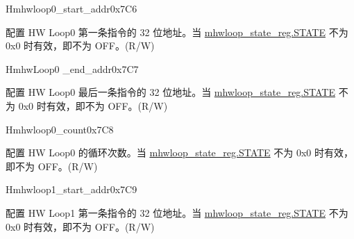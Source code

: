 \begin{register}{H}{mhwloop0\_start\_addr}{0x7C6}\label{regdesc:MHWLOOP0_START_ADDR}
%
\regnewline%
\begin{regdesc}\begin{reglist}
\label{fielddesc:HWLP0_SA}\item [SA] 配置 HW Loop0 第一条指令的 32 位地址。当 \hyperref[fielddesc:HWSTATE]{mhwloop\_state\_reg.STATE} 不为 0x0 时有效，即不为 OFF。(R/W)
\end{reglist}\end{regdesc}
\end{register}

\begin{register}{H}{mhwLoop0 \_end\_addr}{0x7C7}\label{regdesc:MHWLOOP0_END_ADDR}
%
\regnewline%
\begin{regdesc}\begin{reglist}
\label{fielddesc:HWLP0_EA}\item [EA] 配置 HW Loop0 最后一条指令的 32 位地址。当 \hyperref[fielddesc:HWSTATE]{mhwloop\_state\_reg.STATE} 不为 0x0 时有效，即不为 OFF。(R/W)
\end{reglist}\end{regdesc}
\end{register}

\begin{register}{H}{mhwloop0\_count}{0x7C8}\label{regdesc:MHWLOOP0_COUNT}
%
%
\regnewline%
\begin{regdesc}\begin{reglist}
\label{fielddesc:HWLP0_CNT}\item [COUNT] 配置 HW Loop0 的循环次数。当 \hyperref[fielddesc:HWSTATE]{mhwloop\_state\_reg.STATE} 不为 0x0 时有效，即不为 OFF。(R/W)
\end{reglist}\end{regdesc}
\end{register}

\begin{register}{H}{mhwloop1\_start\_addr}{0x7C9}\label{regdesc:MHWLOOP1_START_ADDR}
%
\regnewline%
\begin{regdesc}\begin{reglist}
\label{fielddesc:HWLP1_SA}\item [SA] 配置 HW Loop1 第一条指令的 32 位地址。当 \hyperref[fielddesc:HWSTATE]{mhwloop\_state\_reg.STATE} 不为 0x0 时有效，即不为 OFF。(R/W)
\end{reglist}\end{regdesc}
\end{register}

